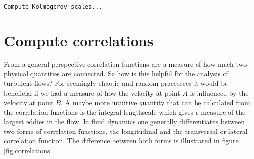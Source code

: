 \documentclass[preprint,12pt,ntfdMod]{elsarticle}
\begin{document}
        \color{lightgray} \begin{verbatim}Compute Kolmogorov scales...
\end{verbatim} \color{black}
    \begin{par}



\end{par} \vspace{1em}


\section{Compute correlations}

\begin{par}

\label{sec:correlation}
From a general perspective correlation functions are a measure of how
much two physical quantities are connected. So how is this helpful for
the analysis of turbulent flows? For seemingly chaotic and random
procescees it would be beneficial if we had a measure of how the velocity
at point $A$ is influenced by the velocity at point $B$. A maybe more
intuitive quantity that can be calculated from the correlation functions
is the integral lengthscale which gives a measure of the largest
eddies in the flow. In fluid dynamics one generally differentiates
between two forms of correlation functions, the longitudinal and the
transversal or lateral correlation function. The difference between both forms is
illustrated in figure \ref{fig:correlations}.
\begin{figure}[t!]
        \centering
        \hfill
\end{figure}
\end{par}
\end{document}
